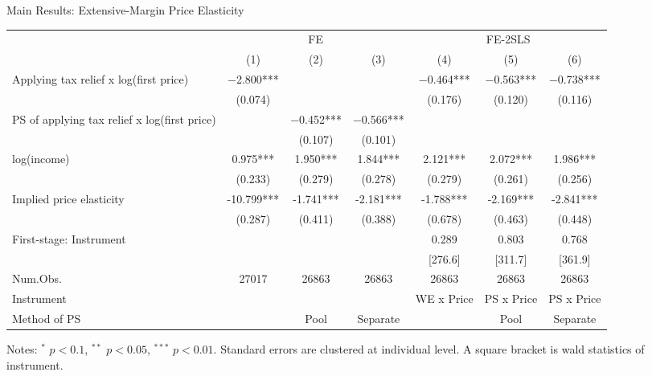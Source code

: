 \documentclass[
  ignorenonframetext,
  aspectratio=169,
]{beamer}
\begin{document}
\begin{frame}{Main Results: Extensive-Margin Price Elasticity}
\protect\hypertarget{main-results-extensive-margin-price-elasticity}{}
\begin{table}
\centering
\fontsize{8}{10}\selectfont
\begin{threeparttable}
\begin{tabular}[t]{>{\raggedright\arraybackslash}p{10em}cccccc}
\toprule
\multicolumn{1}{c}{ } & \multicolumn{3}{c}{FE} & \multicolumn{3}{c}{FE-2SLS} \\
\cmidrule(l{3pt}r{3pt}){2-4} \cmidrule(l{3pt}r{3pt}){5-7}
  & (1) & (2) & (3) & (4) & (5) & (6)\\
\midrule
Applying tax relief x log(first price) & \num{-2.800}*** &  &  & \num{-0.464}*** & \num{-0.563}*** & \num{-0.738}***\\
 & (\num{0.074}) &  &  & (\num{0.176}) & (\num{0.120}) & (\num{0.116})\\
PS of applying tax relief x log(first price) &  & \num{-0.452}*** & \num{-0.566}*** &  &  & \\
 &  & (\num{0.107}) & (\num{0.101}) &  &  & \\
log(income) & \num{0.975}*** & \num{1.950}*** & \num{1.844}*** & \num{2.121}*** & \num{2.072}*** & \num{1.986}***\\
 & (\num{0.233}) & (\num{0.279}) & (\num{0.278}) & (\num{0.279}) & (\num{0.261}) & (\num{0.256})\\
\midrule
Implied price elasticity & -10.799*** & -1.741*** & -2.181*** & -1.788*** & -2.169*** & -2.841***\\
 & (0.287) & (0.411) & (0.388) & (0.678) & (0.463) & (0.448)\\
First-stage: Instrument &  &  &  & 0.289 & 0.803 & 0.768\\
 &  &  &  & {}[276.6] & {}[311.7] & {}[361.9]\\
Num.Obs. & \num{27017} & \num{26863} & \num{26863} & \num{26863} & \num{26863} & \num{26863}\\
Instrument &  &  &  & WE x Price & PS x Price & PS x Price\\
Method of PS &  & Pool & Separate &  & Pool & Separate\\
\bottomrule
\end{tabular}
\begin{tablenotes}
\item Notes: $^{*}$ $p < 0.1$, $^{**}$ $p < 0.05$, $^{***}$ $p < 0.01$. Standard errors are clustered at individual level. A square bracket is wald statistics of instrument.
\end{tablenotes}
\end{threeparttable}
\end{table}
\end{frame}
\end{document}
